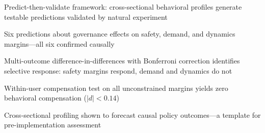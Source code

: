 \begin{highlights}
\item Predict-then-validate framework: cross-sectional behavioral profiles generate testable predictions validated by natural experiment
\item Six predictions about governance effects on safety, demand, and dynamics margins---all six confirmed causally
\item Multi-outcome difference-in-differences with Bonferroni correction identifies selective response: safety margins respond, demand and dynamics do not
\item Within-user compensation test on all unconstrained margins yields zero behavioral compensation ($|d| < 0.14$)
\item Cross-sectional profiling shown to forecast causal policy outcomes---a template for pre-implementation assessment
\end{highlights}
